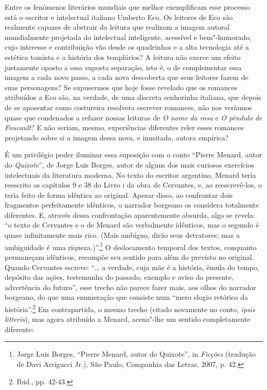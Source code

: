 Entre os fenômenos literários mundiais que melhor exemplificam esse
processo está o escritor e intelectual italiano Umberto Eco. Os leitores
de Eco são realmente capazes de abstrair da leitura que realizam a
imagem autoral mundialmente projetada do intelectual inteligente,
acessível e bem"-humorado, cujo interesse e contribuição vão desde os
quadrinhos e a alta tecnologia até a estética tomista e a história dos
templários? A leitura não exerce um efeito justamente oposto a essa
suposta separação, isto é, o de complementar essa imagem a cada novo
passo, a cada nova descoberta que seus leitores fazem de suas
personagens? Se supusermos que hoje fosse revelado que os romances
atribuídos a Eco são, na verdade, de uma discreta senhorinha italiana,
que depois de se aposentar como costureira resolvera escrever romances,
não nos veríamos quase que condenados a refazer nossas leituras de
\emph{O nome da rosa} e \emph{O pêndulo de Foucault}? E não seriam,
mesmo, experiências diferentes reler esses romances projetando sobre si
a imagem dessa nova, e inusitada, autora empírica?

É um privilégio poder iluminar essa suposição com o conto ``Pierre
Menard, autor do \emph{Quixote}'', de Jorge Luis Borges, autor de alguns
dos mais curiosos exercícios intelectuais da literatura moderna. No
texto do escritor argentino, Menard teria reescrito os capítulos 9 e 38
do Livro \textsc{i} da obra de Cervantes, e, ao reescrevê-los, o teria
feito de forma idêntica ao original. Apesar disso, ao confrontar dois
fragmentos perfeitamente idênticos, o narrador borgeano os considera
totalmente diferentes. E, através dessa confrontação aparentemente
absurda, algo se revela: ``o texto de Cervantes e o de Menard são
verbalmente idênticos, mas o segundo é quase infinitamente mais rico.
(Mais ambíguo, dirão seus detratores; mas a ambiguidade é uma
riqueza.)''.\footnote{Jorge Luis Borges, ``Pierre Menard, autor do
  Quixote'', in \emph{Ficções} (tradução de Davi Arrigucci Jr.), São
  Paulo, Companhia das Letras, 2007, p. 42.} O deslocamento temporal dos
textos, conquanto permaneçam idênticos, recompõe seu sentido para além
do previsto no original. Quando Cervantes escreve: ``\ldots{} a verdade, cuja
mãe é a história, êmula do tempo, depósito das ações, testemunha do
passado, exemplo e aviso do presente, advertência do futuro'', esse
trecho não parece fazer mais, aos olhos do narrador borgeano, do que uma
enumeração que consiste num ``mero elogio retórico da
história''.\footnote{Ibid., pp. 42-43.} Em contrapartida, o mesmo trecho
(citado novamente no conto, \emph{ipsis litteris}), mas agora atribuído
a Menard, acena"-lhe um sentido completamente diferente:


